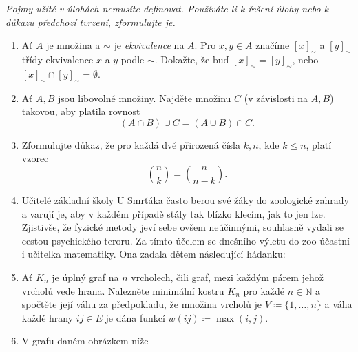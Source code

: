 \documentclass[a4paper,11pt]{article}
\newcommand{\N}{\mathbb{N}}
\begin{document}
 \begin{tcolorbox}[title=\textsf{Lehké úlohy a důkazy (6
  bodů)},arc=0mm,boxsep=3mm,bottomrule=1pt,toprule=1pt,leftrule=-0.1mm,
  rightrule=-0.1mm,colframe=Emerald!80!white,colback=Emerald!5!white]
  \emph{Pojmy užité v úlohách nemusíte definovat. Používáte-li k řešení úlohy
  nebo k důkazu předchozí tvrzení, zformulujte je.}
  \begin{enumerate}
   \item Ať $A$ je množina a $ \sim $ je \emph{ekvivalence} na $A$. Pro $x,y \in
    A$ značíme $[x]_{ \sim }$ a $[y]_{ \sim }$ třídy ekvivalence $x$ a $y$ podle
    $ \sim $. Dokažte, že buď $[x]_{ \sim } = [y]_{ \sim }$, nebo $[x]_{ \sim
    } \cap [y]_{ \sim } = \emptyset$.
   \item Ať $A,B$ jsou libovolné množiny. Najděte množinu $C$ (v závislosti na
    $A,B$) takovou, aby platila rovnost
    \[
     (A \cap B) \cup C = (A \cup B) \cap C.
    \]
  \item Zformulujte důkaz, že pro každá dvě přirozená čísla $k,n$, kde $k \leq
   n$, platí vzorec
   \[
    \binom{n}{k} = \binom{n}{n-k}.
   \]
  \item Učitelé základní školy U Smrťáka často berou své žáky do zoologické
   zahrady a varují je, aby v každém případě stály tak blízko klecím, jak to jen
   lze. Zjistivše, že fyzické metody jeví sebe ovšem neúčinnými, souhlasně
   vydali se cestou psychického teroru. Za tímto účelem se dnešního výletu do
   zoo účastní i učitelka matematiky. Ona zadala dětem následující hádanku:
  
  \item Ať $K_n$ je úplný graf na $n$ vrcholech, čili graf, mezi každým párem
   jehož vrcholů vede hrana. Nalezněte minimální kostru $K_n$ pro každé $n \in
   \N$ a spočtěte její váhu za předpokladu, že množina vrcholů je $V \coloneqq
   \{1,\ldots,n\}$ a váha každé hrany $ij \in E$ je dána funkcí $w(ij) \coloneqq
   \max(i,j)$.
  \item V grafu daném obrázkem níže
   \begin{center}
\end{center}
\end{enumerate}
\end{tcolorbox}
\end{document}
